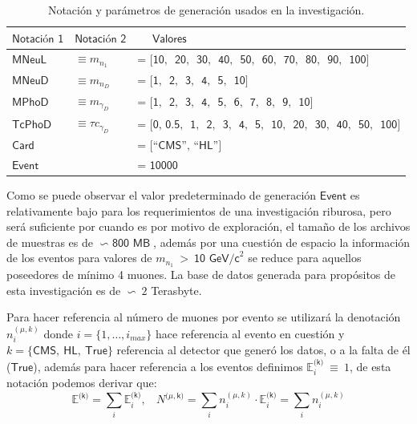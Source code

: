 \begin{table}[!ht]
\centering
\begin{tabular}{|lll|}
\hline
$\textsf{Notación 1}$  & $\textsf{Notación 2}$  & $\textsf{~~~~Valores}$\\
\hline
$\textsf{MNeuL}$    & $\equiv m_{n_1}$  & $\textsf{= [10, ~20, ~30, ~40, ~50, ~60, ~70, ~80, ~90, ~100]}$\\
$\textsf{MNeuD}$    & $\equiv m_{n_D}$  & $\textsf{= [1, ~2, ~3, ~4, ~5, ~10]}$\\
$\textsf{MPhoD}$    & $\equiv m_{\gamma_D}$  & $\textsf{= [1, ~2, ~3, ~4, ~5, ~6, ~7, ~8, ~9, ~10]}$\\
$\textsf{TcPhoD}$   & $\equiv \tau c_{\gamma_D}$  & $\textsf{= [0,~0.5, ~1, ~2, ~3, ~4, ~5, ~10, ~20, ~30, ~40, ~50, ~100]}$\\
$\textsf{Card}$     & & $\textsf{= [``CMS'', ``HL'']}$ \\
$\textsf{Event}$    & & $\textsf{= 10000}$ \\
\hline
\end{tabular}%
\caption{Notación y parámetros de generación usados en la investigación.}
\label{parametros_generacion}
\end{table}

Como se puede observar el valor predeterminado de generación $\textsf{Event}$ es relativamente bajo para los requerimientos de una investigación riburosa, pero será suficiente por cuando es por motivo de exploración, el tamaño de los archivos de muestras es de $\backsim\textsf{ 800 MB}$, además por una cuestión de espacio la información de los eventos para valores de $m_{n_1}~>~\textsf{10 GeV/c}^2$ %
se reduce para aquellos poseedores de mínimo 4 muones. La base de datos generada para propósitos de esta investigación es de $\backsim ~2$ Terasbyte.

Para hacer referencia al número de muones por evento se utilizará la denotación $n_i^{(\mu,k)}$ donde $i = \{1, \ldots, i_{max}\}$ hace referencia al evento en cuestión y $k = \{\textsf{CMS},~\textsf{HL}, ~\textsf{True}\}$ referencia al detector que generó los datos, o a la falta de él ($\textsf{True}$), además para hacer referencia a los eventos definimos $\mathbb{E}_i^\textsf{(k)} ~ \equiv ~1$, de esta notación podemos derivar que:
\begin{equation}\label{notaEvent}
\mathbb{E}^\textsf{(k)} = \sum_i \mathbb{E}_i^\textsf{(k)} , ~~~~ N^{(\mu,\textsf{k)}} = \sum_i n_i^{(\mu,k)} \cdot \mathbb{E}_i^{(\textsf{k)}} = \sum_i n_i^{(\mu,k)}
\end{equation}

